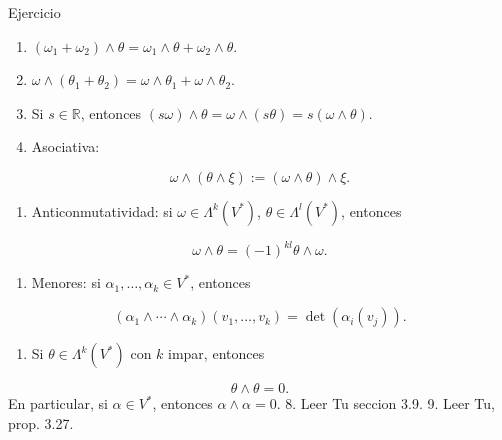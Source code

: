 \begin{bookproposition}{Ejercicio}
\begin{enumerate}
\item $(\omega_1+\omega_2)\wedge\theta=\omega_1\wedge\theta+\omega_2\wedge\theta$.
\item $\omega\wedge(\theta_1+\theta_2)=\omega\wedge\theta_1+\omega\wedge\theta_2$.
\item Si $s\in\mathbb R$, entonces $(s\omega)\wedge\theta=\omega\wedge(s\theta)=s(\omega\wedge\theta)$.
\item Asociativa:
\end{enumerate}
\[
\omega\wedge(\theta\wedge\xi):=(\omega\wedge\theta)\wedge\xi.
\]
\begin{enumerate}[start=5]
\item Anticonmutatividad: si $\omega\in\Lambda^k(V^*)$, $\theta\in\Lambda^l(V^*)$, entonces
\end{enumerate}
\[
\omega\wedge\theta=(-1)^{kl}\theta\wedge\omega.
\]
\begin{enumerate}[start=6]
\item Menores: si $\alpha_1,\ldots,\alpha_k\in V^*$, entonces
\end{enumerate}
\[
(\alpha_1\wedge\cdots\wedge\alpha_k)(v_1,\ldots,v_k)=\det(\alpha_i(v_j)).
\]
\begin{enumerate}[start=7]
\item Si $\theta\in\Lambda^k(V^*)$ con $k$ impar, entonces
\end{enumerate}
\[
\theta\wedge\theta=0.
\]
En particular, si $\alpha\in V^*$, entonces $\alpha\wedge\alpha=0$. 8. Leer Tu seccion 3.9. 9. Leer Tu, prop. 3.27.

\end{bookproposition}
